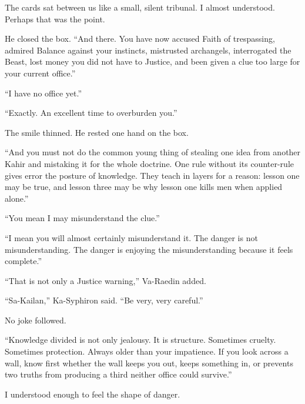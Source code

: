 The cards sat between us like a small, silent tribunal. I almost understood. Perhaps that was the point.\par

He closed the box.
``And there. You have now accused Faith of trespassing, admired Balance against your instincts, mistrusted archangels, interrogated the Beast, lost money you did not have to Justice, and been given a clue too large for your current office.''\par

``I have no office yet.''\par

``Exactly. An excellent time to overburden you.''\par

The smile thinned. He rested one hand on the box.\par

``And you must not do the common young thing of stealing one idea from another Kahir and mistaking it for the whole doctrine. One rule without its counter-rule gives error the posture of knowledge. They teach in layers for a reason: lesson one may be true, and lesson three may be why lesson one kills men when applied alone.''\par

``You mean I may misunderstand the clue.''\par

``I mean you will almost certainly misunderstand it. The danger is not misunderstanding. The danger is enjoying the misunderstanding because it feels complete.''\par

``That is not only a Justice warning,'' Va-Raedin added.\par

``Sa-Kailan,'' Ka-Syphiron said. ``Be very, very careful.''\par

No joke followed.\par

``Knowledge divided is not only jealousy. It is structure. Sometimes cruelty. Sometimes protection. Always older than your impatience.
If you look across a wall, know first whether the wall keeps you out, keeps something in, or prevents two truths from producing a third neither office could survive.''\par

I understood enough to feel the shape of danger.\par

